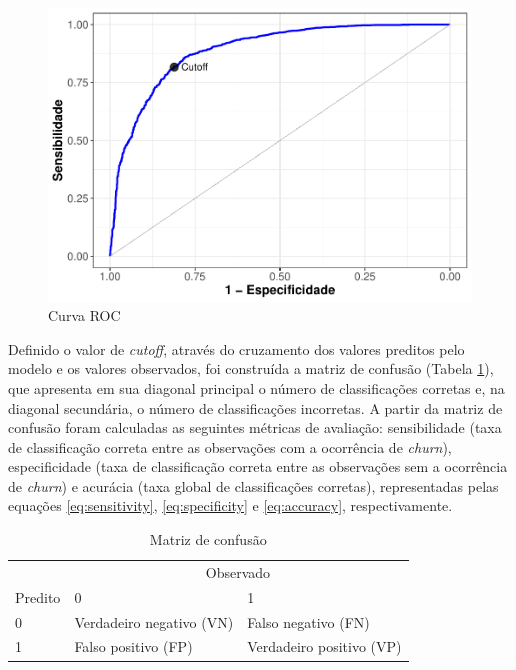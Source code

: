 \documentclass[twocolumn]{rbef}
\newcommand{\1}{\mathbbm{1}}
\begin{document}
\begin{figure}

{\centering \includegraphics[width=1\linewidth]{article_files/figure-latex/roc-1} 

}

\caption{Curva ROC}\label{fig:roc}
\end{figure}

Definido o valor de \textit{cutoff}, através do cruzamento dos valores preditos pelo modelo e os valores observados, foi construída a matriz de confusão (Tabela \ref{tab:cmatrix}), que apresenta em sua diagonal principal o número de classificações corretas e, na diagonal secundária, o número de classificações incorretas. A partir da matriz de confusão foram calculadas as seguintes métricas de avaliação: sensibilidade (taxa de classificação correta entre as observações com a ocorrência de \textit{churn}), especificidade (taxa de classificação correta entre as observações sem a ocorrência de \textit{churn}) e acurácia (taxa global de classificações corretas), representadas pelas equações \eqref{eq:sensitivity}, \eqref{eq:specificity} e \eqref{eq:accuracy}, respectivamente.

\begin{table}

\caption{\label{tab:cmatrix}Matriz de confusão}
\centering
\fontsize{9}{11}\selectfont
\begin{tabular}[t]{lll}
\toprule
\multicolumn{1}{c}{} & \multicolumn{2}{c}{Observado} \\
\cmidrule(l{3pt}r{3pt}){2-3}
Predito & 0 & 1\\
\midrule
0 & Verdadeiro negativo (VN) & Falso negativo (FN)\\
1 & Falso positivo (FP) & Verdadeiro positivo (VP)\\
\bottomrule
\end{tabular}
\end{table}
\end{document}
